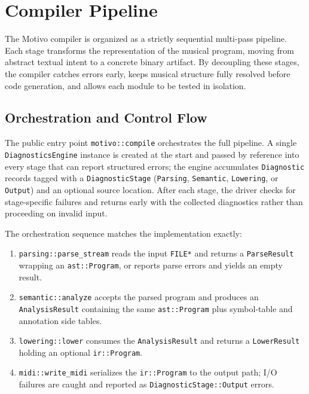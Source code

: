 \section{Compiler Pipeline}\label{sec:compiler-pipeline}

The Motivo compiler is organized as a strictly sequential multi-pass pipeline.
Each stage transforms the representation of the musical program, moving from abstract textual intent to a
concrete binary artifact.
By decoupling these stages, the compiler catches errors early, keeps musical structure fully resolved before code
generation, and allows each module to be tested in isolation.

\subsection{Orchestration and Control Flow}\label{detail-subsec:orchestration}

The public entry point \texttt{motivo::compile} orchestrates the full pipeline.
A single \texttt{DiagnosticsEngine} instance is created at the start and passed by reference into every stage that can
report structured errors; the engine accumulates \texttt{Diagnostic} records tagged with a \texttt{DiagnosticStage}
(\texttt{Parsing}, \texttt{Semantic}, \texttt{Lowering}, or \texttt{Output}) and an optional source location.
After each stage, the driver checks for stage-specific failures and returns early with the collected diagnostics rather
than proceeding on invalid input.

The orchestration sequence matches the implementation exactly:

\begin{enumerate}
  \item \texttt{parsing::parse\_stream} reads the input \texttt{FILE*} and returns a \texttt{ParseResult} wrapping an
    \texttt{ast::Program}, or reports parse errors and yields an empty result.
  \item \texttt{semantic::analyze} accepts the parsed program and produces an \texttt{AnalysisResult} containing the
    same \texttt{ast::Program} plus symbol-table and annotation side tables.
  \item \texttt{lowering::lower} consumes the \texttt{AnalysisResult} and returns a \texttt{LowerResult} holding an
    optional \texttt{ir::Program}.
  \item \texttt{midi::write\_midi} serializes the \texttt{ir::Program} to the output path; I/O failures are caught and
    reported as \texttt{DiagnosticStage::Output} errors.
\end{enumerate}

